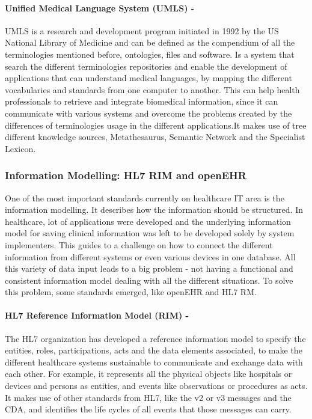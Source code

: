 \documentclass[mim_thesis.tex]{subfiles}
\begin{document}
\paragraph{\textbf{Unified Medical Language System (UMLS) -}}
UMLS is a research and development program initiated in 1992 by the US National Library of Medicine and can be defined as the compendium of all the terminologies mentioned before, ontologies, files and software. Is a system that search the different terminologies repositories and enable the development of applications that can understand medical languages, by mapping the different vocabularies and standards from one computer to another. This can help health professionals to retrieve and integrate biomedical information, since it can communicate with various systems and overcome the problems created by the differences of terminologies usage in the different applications.It makes use of tree different knowledge sources, Metathesaurus, Semantic Network and the Specialist Lexicon.


\subsubsection{Information Modelling: HL7 RIM and openEHR }
One of the most important standards currently on healthcare IT area is the information modelling. It describes how the information should be structured. In healthcare, lot of applications were developed and the underlying information model for saving clinical information was left to be developed solely by system implementers. This guides to a challenge on how to connect the different information from different systems or even various devices in one database. \citep{huff1995event} All this variety of data input leads to a big problem - not having a functional and consistent information model dealing with all the different situations. To solve this problem, some standards emerged, like openEHR and HL7 RM. \citep{piho2015business}

\paragraph{\textbf{HL7 Reference Information Model (RIM) -}}
The HL7 organization has developed a reference information model to specify the entities, roles, participations, acts and the data elements associated, to make the different healthcare systems sustainable to communicate and exchange data with each other. For example, it represents all the physical objects like hospitals or devices and persons as entities, and events like observations or procedures as acts. It makes use of other standards from HL7, like the v2 or v3 messages and the CDA, and identifies the life cycles of all events that those messages can carry.
\end{document}

